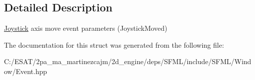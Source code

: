 \subsection{Detailed Description}
\hyperlink{classsf_1_1_joystick}{Joystick} axis move event parameters (Joystick\+Moved) 

The documentation for this struct was generated from the following file\+:\begin{DoxyCompactItemize}
\item 
C\+:/\+E\+S\+A\+T/2pa\+\_\+ma\+\_\+martinezcajm/2d\+\_\+engine/deps/\+S\+F\+M\+L/include/\+S\+F\+M\+L/\+Window/Event.\+hpp\end{DoxyCompactItemize}
